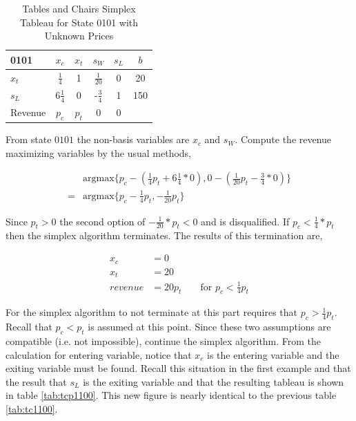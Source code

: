 \begin{table}
\centering
\begin{tabular}{| l | c c c c | c |}
\hline
0101    & $x_c$ & $x_t$ & $s_W$ & $s_L$ & $b$\\
\hline
$x_t$   & $\frac{1}{4}$     & 1    & $\frac{1}{20}$     & 0     & 20\\
$s_L$   & 6$\frac{1}{4}$    & 0    & -$\frac{3}{4}$     & 1     & 150\\
\hline
Revenue & $p_c$   & $p_t$    & 0     & 0     &\\
\hline
\end{tabular}
  \caption[Tables and Chairs Simplex Tableau for State 0101 with Unknown Prices]
          {Tables and Chairs Simplex Tableau for State 0101 with Unknown Prices}
  \label{tab:tcp0101}
\end{table}

From state $0101$ the non-basis variables are $x_c$ and $s_W$. Compute the revenue maximizing variables by the usual methods,

\begin{align*}
&\text{argmax}\{p_c - (\frac{1}{4}p_t + 6\frac{1}{4}*0), 0 -
(\frac{1}{20}p_t - \frac{3}{4}*0)\}\\
= &\text{argmax}\{p_c - \frac{1}{4}p_t, -\frac{1}{20}p_t\}
\end{align*}

Since $p_t > 0$ the second option of $-\frac{1}{20}*p_t < 0$ and is disqualified. If $p_c < \frac{1}{4}*p_t$ then the simplex algorithm terminates. The results of this termination are,

\begin{align*}
x_c &= 0\\
x_t &= 20\\
revenue &= 20p_t && \text{ for } p_c < \frac{1}{4}p_t
\end{align*}

For the simplex algorithm to not terminate at this part requires that $p_c > \frac{1}{4}p_t$. Recall that $p_c < p_t$ is assumed at this point. Since these two assumptions are compatible (i.e. not impossible), continue the simplex algorithm. From the calculation for entering variable, notice that $x_c$ is the entering variable and the exiting variable must be found. Recall this situation in the first example and that the result that $s_L$ is the exiting variable and that the resulting tableau is shown in table \ref{tab:tcp1100}. This new figure is nearly identical to the previous table \ref{tab:tc1100}.

